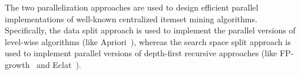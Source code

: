 The two parallelization approaches are used to design efficient parallel implementations of well-known centralized itemset mining algorithms.  Specifically, the data split approach is used to implement the parallel versions of level-wise algorithms (like Apriori~\cite{Agr94}), whereas the search space split approach is used to implement parallel versions of depth-first recursive approaches (like FP-growth~\cite{Han00} and Eclat~\cite{Zaki97newalgorithms}). 




%
%
%
